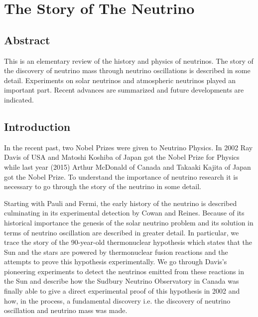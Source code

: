 \chapter{The Story of The Neutrino}\label{chap23}



\section*{Abstract}

This is an elementary review of the history and physics of neutrinos. The story of the discovery of neutrino mass through neutrino
oscillations is described in some detail. Experiments on solar neutrinos and atmospheric neutrinos played an important part. Recent
advances are summarized and future developments are indicated.

\section{Introduction}

In the recent past, two Nobel Prizes were given to Neutrino Physics.
In 2002 Ray Davis of USA and Matoshi Koshiba of Japan got the Nobel
Prize for Physics while last year (2015) Arthur McDonald of Canada and
Takaaki Kajita of Japan got the Nobel Prize. To understand the importance
of neutrino research it is necessary to go through the story of the neutrino
in some detail.

Starting with Pauli and Fermi, the early history of the neutrino is described culminating in its experimental detection by Cowan and Reines. Because of its historical importance the genesis of the solar neutrino problem
and its solution in terms of neutrino oscillation are described in greater detail.
In particular, we trace the story of the 90-year-old thermonuclear hypothesis
which states that the Sun and the stars are powered by thermonuclear fusion
reactions and the attempts to prove this hypothesis experimentally. We go
through Davis’s pioneering experiments to detect the neutrinos emitted from
these reactions in the Sun and describe how the Sudbury Neutrino Observatory in Canada was finally able to give a direct experimental proof of this
hypothesis in 2002 and how, in the process, a fundamental discovery i.e. the
discovery of neutrino oscillation and neutrino mass was made.

